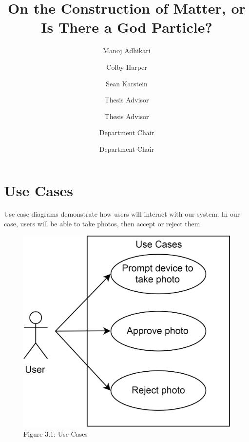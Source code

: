 \documentclass{scu-thesis}
\author{Manoj Adhikari}
\author{Colby Harper}
\author{Sean Karstein}
\title{On the Construction of Matter, or Is There a God Particle?}
\begin{document}
\frontmatter
\signature{Thesis Advisor}
\signature{Thesis Advisor}
\signature{Department Chair}
\signature{Department Chair}

\maketitle


\tableofcontents
\listoffigures

\mainmatter




\chapter{Use Cases}
Use case diagrams demonstrate how users will interact with our system. In our case, users will be able to take photos, then accept or reject them.

\begin{figure}[!h]
    \centering
    \includegraphics[scale=0.25]{usecasediagram}
    \caption{Figure 3.1: Use Cases}
    \label{fig:usecasediagram}
\end{figure}
\end{document}
